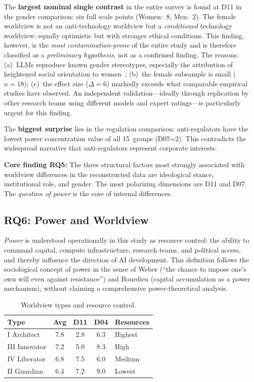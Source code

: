 \documentclass[12pt,a4paper]{article}
\begin{document}
The \textbf{largest nominal single contrast} in the entire survey is found at D11 in the gender comparison: six full scale points (Women:~8, Men:~2). The female worldview is not an anti-technology worldview but a \emph{conditioned} technology worldview: equally optimistic but with stronger ethical conditions. This finding, however, is the \emph{most contamination-prone} of the entire study and is therefore classified as a \emph{preliminary hypothesis}, not as a confirmed finding. The reasons: (a)~LLMs reproduce known gender stereotypes, especially the attribution of heightened social orientation to women~\citep{Santurkar2023}; (b)~the female subsample is small ($n = 18$); (c)~the effect size ($\Delta = 6$) markedly exceeds what comparable empirical studies have observed. An independent validation---ideally through replication by other research teams using different models and expert ratings---is particularly urgent for this finding.

The \textbf{biggest surprise} lies in the regulation comparison: anti-regulators have the lowest power concentration value of all 15~groups (D07=2). This contradicts the widespread narrative that anti-regulators represent corporate interests.

\medskip
\noindent\textbf{Core finding RQ5:} The three structural factors most strongly associated with worldview differences in the reconstructed data are ideological stance, institutional role, and gender. The most polarizing dimensions are D11 and D07. The \emph{question of power} is the core of internal differences.


\subsection{RQ6: Power and Worldview}
\label{sec:ergebnisse:f6}

\emph{Power} is understood operationally in this study as resource control: the ability to command capital, compute infrastructure, research teams, and political access, and thereby influence the direction of AI development. This definition follows the sociological concept of power in the sense of Weber (``the chance to impose one's own will even against resistance'') and Bourdieu (capital accumulation as a power mechanism), without claiming a comprehensive power-theoretical analysis.

\begin{table}[htbp]
  \centering
  \caption{Worldview types and resource control.}
  \label{tab:macht}
  \begin{tabular}{l c c c l}
    \toprule
    \textbf{Type} & \textbf{Avg} & \textbf{D11} & \textbf{D04} & \textbf{Resources} \\
    \midrule
    I Architect   & 7.8 & 2.8 & 6.3 & Highest \\
    \addlinespace[2pt]
    III Innovator & 7.2 & 5.0 & 8.3 & High \\
    \addlinespace[2pt]
    IV Liberator  & 6.8 & 7.5 & 6.0 & Medium \\
    \addlinespace[2pt]
    II Guardian   & 6.4 & 7.2 & 9.0 & Lowest \\
    \bottomrule
  \end{tabular}
\end{table}
\end{document}

